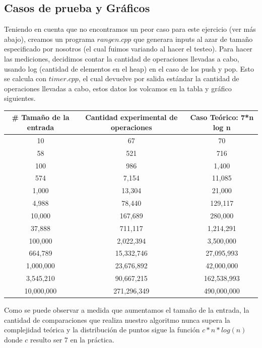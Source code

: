 \documentclass[a4paper, 10pt]{article}
\begin{document}
\subsection{Casos de prueba y Gráficos}

Teniendo en cuenta que no encontramos un peor caso para este ejercicio (ver más abajo), creamos un programa $rangen.cpp$ que generara inputs al azar de tamaño especificado por nosotros (el cual fuimos variando al hacer el testeo). Para hacer las mediciones, decidimos contar la cantidad de operaciones llevadas a cabo, usando log (cantidad de elementos en el heap) en el caso de los push y pop. Esto se calcula con $timer.cpp$, el cual devuelve por salida estándar la cantidad de operaciones llevadas a cabo, estos datos los volcamos en la tabla y gráfico siguientes.

\begin{center}
\begin{tabular}{|c|c|c|}
\hline
\# Tamaño de la entrada & Cantidad experimental de operaciones & Caso Teórico: 7*n log n\\
\hline
10 & 67	& 70\\
\hline
58 & 521 & 716\\
\hline
100 & 986 & 1,400\\
\hline
574 & 7,154 & 11,085\\
\hline
1,000 & 13,304 & 21,000\\
\hline
4,988 & 78,440 & 129,117\\
\hline
10,000 & 167,689 & 280,000\\
\hline
37,888 & 711,117 & 1,214,291\\
\hline
100,000 & 2,022,394 & 3,500,000\\
\hline
664,789 & 15,332,746 & 27,095,993\\
\hline
1,000,000 & 23,676,892 & 42,000,000\\
\hline
3,545,210 & 90,667,215 & 162,538,993\\
\hline
10,000,000 & 271,296,349 & 490,000,000\\
\hline
\end{tabular}
\end{center} \vspace{0,15cm}

Como se puede observar a medida que aumentamos el tamaño de la entrada, la cantidad de comparaciones que realiza nuestro algoritmo nunca supera la complejidad teórica y la distribución de puntos sigue la función $c*n * log(n)$ donde $c$ resulto ser 7 en la práctica.
\end{document}
